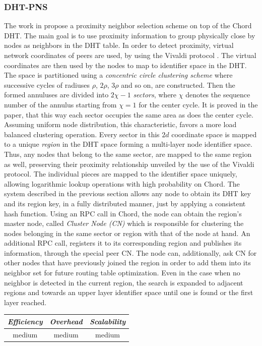 \subsubsection{DHT-PNS}
The work in \cite{DLTZZ2006} propose a proximity neighbor selection
scheme on top of the Chord DHT. The main goal is to use proximity information
to group physically close by nodes as neighbors in the DHT table. In order to
detect proximity, virtual network coordinates of peers are used, by using the
Vivaldi protocol \cite{cox_vivaldi_2004}. The virtual coordinates are then used
by the nodes to map to identifier space in the DHT. The space is partitioned
using a \emph{concentric circle clustering scheme} where successive cycles of
radiuses $\rho$, $2\rho$, $3\rho$ and so on, are constructed. Then the formed
annuluses are divided into $2\chi-1$ \emph{sectors}, where $\chi$ denotes the
sequence number of the annulus starting from $\chi = 1$ for the center cycle. It
is proved in the paper, that this way each sector occupies the same area as does
the center cycle. Assuming uniform node distribution, this characteristic,
favors a more load balanced clustering operation. Every sector in this $2d$
coordinate space is mapped to a unique \emph{region} in the DHT space forming a
multi-layer node identifier space.  Thus, any nodes that belong to the same
sector, are mapped to the same region as well, preserving their proximity
relationship unveiled by the use of the Vivaldi protocol. The individual pieces
are mapped to the identifier space uniquely, allowing logarithmic lookup
operations with high probability on Chord. The system described in the previous
section allows any node to obtain its DHT key and its region key, in a fully
distributed manner, just by applying a consistent hash function. Using an RPC
call in Chord, the node can obtain the region's master node, called
\emph{Cluster Node (CN)} which is responsible for clustering the nodes belonging
in the same sector or region with that of the node at hand. An additional RPC
call, registers it to its corresponding region and publishes its information,
through the special peer CN. The node can, additionally, ask CN for other
nodes that have previously joined the region in order to add them into its
neighbor set for future routing table optimization. Even in the case when no
neighbor is detected in the current region, the search is expanded to adjacent
regions and towards an upper layer identifier space until one is found or the
first layer reached.

\begin{center}
\begin{tabular}{ccc}
\emph{Efficiency} & \emph{Overhead} & \emph{Scalability} \\
\hline
%
medium &
%
medium &
%
medium
\end{tabular}
\end{center}

